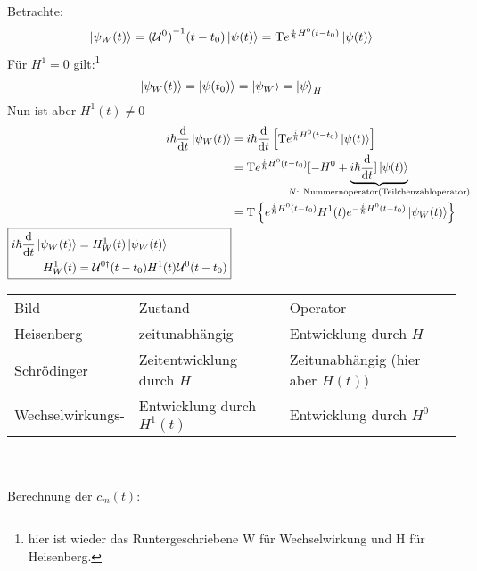 	Betrachte:
		\begin{equation*}
			\ket{\psi_W(t)} = {(\mathcal{U}^0)}^{-1} (t-t_0) \ket{\psi(t)} 
			= \text{T} e^{\frac{i}{\hbar} H^0 (t-t_0)} \ket{\psi(t)} 
		\end{equation*}
	Für $H^1=0$ gilt:\footnote{hier ist wieder das Runtergeschriebene W für Wechselwirkung und H für Heisenberg.}
		\begin{equation*}
			\ket{\psi_W(t)} = \ket{\psi(t_0)} = \ket{\psi_W} = \ket{\psi}_H
		\end{equation*}
	Nun ist aber $H^1(t) \neq 0$
		\begin{align}
			i\hbar \frac{\diff}{\diff t} \ket{\psi_W(t)} &=
			i\hbar \frac{\diff}{\diff t} \left[\text{T} e^{\frac{i}{\hbar} H^0(t-t_0)} \ket{\psi(t)}\right] \nonumber \\ \nonumber
			&= \text{T} e^{\frac{i}{\hbar} H^0(t-t_0)} [ -H^0 + \underbrace{i\hbar \frac{\diff}{\diff t}] \ket{\psi(t)}}_{\mathclap{N \text{: Nummernoperator(Teilchenzahloperator)}}} \\ \nonumber
			&= \text{T} \left\{ e^{\frac{i}{\hbar} H^0(t-t_0)} H^1(t) e^{-\frac{i}{\hbar} H^0(t-t_0)} \ket{\psi_W(t)}\right\}  \\ 
			\boxed{
		\begin{aligned}i\hbar \frac{\diff}{\diff t} \ket{\psi_W(t)} 
				&= H^1_W(t) \ket{\psi_W(t)}  \\ 
				H^1_W(t)& = \U^{0\dagger} (t-t_0) H^1(t) \U^0(t-t_0) 
		\end{aligned}
			} \label{Wechselwirkung}
		\end{align}
		\begin{tabular*}{\linewidth}{l l l}
			Bild & Zustand & Operator \\
			Heisenberg & zeitunabhängig & Entwicklung durch $H$ \\
			Schrödinger & Zeitentwicklung durch $H$ & Zeitunabhängig (hier aber $H(t))$ \\
			Wechselwirkungs- & Entwicklung durch $H^1(t)$ & Entwicklung durch $H^0$
		\end{tabular*} %
		 \\ \\
	Berechnung der $c_m(t)$:
	
